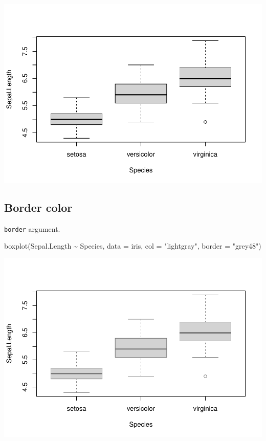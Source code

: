 \documentclass[
]{book}
\newenvironment{Shaded}{\begin{snugshade}}{\end{snugshade}}
\newcommand{\AttributeTok}[1]{\textcolor[rgb]{0.77,0.63,0.00}{#1}}
\newcommand{\FunctionTok}[1]{\textcolor[rgb]{0.00,0.00,0.00}{#1}}
\newcommand{\NormalTok}[1]{#1}
\newcommand{\SpecialCharTok}[1]{\textcolor[rgb]{0.00,0.00,0.00}{#1}}
\newcommand{\StringTok}[1]{\textcolor[rgb]{0.31,0.60,0.02}{#1}}
\begin{document}
\begin{center}\includegraphics{_main_files/figure-latex/unnamed-chunk-124-1} \end{center}

\hypertarget{border-color}{%
\subsection{Border color}\label{border-color}}

\texttt{border} argument.

\begin{Shaded}
\begin{Highlighting}[]
\FunctionTok{boxplot}\NormalTok{(Sepal.Length }\SpecialCharTok{\textasciitilde{}}\NormalTok{ Species, }\AttributeTok{data =}\NormalTok{ iris,}
        \AttributeTok{col =} \StringTok{"lightgray"}\NormalTok{, }\AttributeTok{border =} \StringTok{"grey48"}\NormalTok{)}
\end{Highlighting}
\end{Shaded}

\begin{center}\includegraphics{_main_files/figure-latex/unnamed-chunk-125-1} \end{center}
\end{document}

